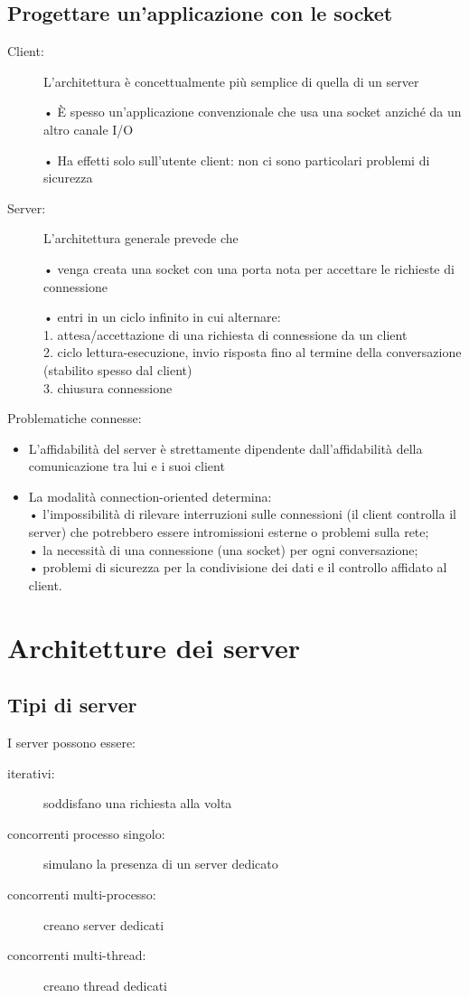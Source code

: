 \section{Progettare un'applicazione con le socket}
\begin{description}
    \item[Client:] L'architettura è concettualmente più semplice di quella di un server
    \item[] • È spesso un'applicazione convenzionale che usa una socket anziché da un altro canale I/O
    \item[] • Ha effetti solo sull'utente client: non ci sono particolari problemi di sicurezza
    \item[Server:] L'architettura generale prevede che
    \item[] • venga creata una socket con una porta nota per accettare le richieste di connessione
    \item[] • entri in un ciclo infinito in cui alternare:
    \\1. attesa/accettazione di una richiesta di connessione da un client
    \\2. ciclo lettura-esecuzione, invio risposta fino al termine della conversazione (stabilito spesso dal client)
    \\3. chiusura connessione
\end{description}
Problematiche connesse:
\begin{itemize}
    \item L'affidabilità del server è strettamente dipendente dall'affidabilità della comunicazione tra lui e i suoi client
    \item La modalità connection-oriented determina:
    \\• l'impossibilità di rilevare interruzioni sulle connessioni (il client controlla il server) che potrebbero essere intromissioni esterne o problemi sulla rete;
    \\• la necessità di una connessione (una socket) per ogni conversazione;
    \\• problemi di sicurezza per la condivisione dei dati e il controllo affidato al client.
\end{itemize}

\chapter{Architetture dei server}
\section{Tipi di server}
I server possono essere:
\begin{description}
    \item[iterativi:] soddisfano una richiesta alla volta
    \item[concorrenti processo singolo:] simulano la presenza di un server dedicato
    \item[concorrenti multi-processo:] creano server dedicati
    \item[concorrenti multi-thread:] creano thread dedicati
\end{description}

